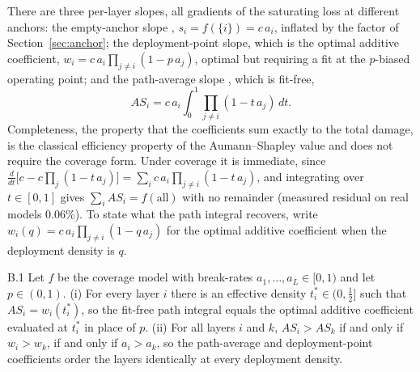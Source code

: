 There are three per-layer slopes, all gradients of the saturating loss at different anchors: the
empty-anchor slope \citep[HAWQ, isolated;][]{hawq2019,dong2020hawqv2}, $s_i = f(\{i\}) = c\,a_i$, inflated
by the factor of Section~\ref{sec:anchor}; the deployment-point slope, which is the optimal additive coefficient,
$w_i = c\,a_i\prod_{j\ne i}(1 - p\,a_j)$, optimal but requiring a fit at the $p$-biased operating point;
and the path-average slope \citep[Aumann--Shapley;][]{aumann1974values,sundararajan2017ig}, which is
fit-free,
\[
  AS_i = c\,a_i\int_0^1 \prod_{j\ne i}(1 - t\,a_j)\,dt .
\]
Completeness, the property that the coefficients sum exactly to the total damage, is the classical
efficiency property of the Aumann--Shapley value and does not require the coverage form.
Under coverage it is immediate, since
$\frac{d}{dt}\bigl[c - c\prod_j(1 - t\,a_j)\bigr] = \sum_i c\,a_i\prod_{j\ne i}(1 - t\,a_j)$, and
integrating over $t \in [0,1]$ gives $\sum_i AS_i = f(\text{all})$ with no remainder (measured residual
on real models 0.06\%). To state what the path integral recovers, write
$w_i(q) = c\,a_i\prod_{j\ne i}(1 - q\,a_j)$ for the optimal additive coefficient when the deployment
density is $q$.

\begin{customprop}{B.1}\label{prop:asrec}
Let $f$ be the coverage model with break-rates $a_1, \ldots, a_L \in [0,1)$ and let $p \in (0,1)$.
(i) For every layer $i$ there is an effective density $t_i^{*} \in (0, \tfrac12]$ such that
$AS_i = w_i(t_i^{*})$, so the fit-free path integral equals the optimal additive coefficient evaluated
at $t_i^{*}$ in place of $p$. (ii) For all layers $i$ and $k$, $AS_i > AS_k$ if and only if
$w_i > w_k$, if and only if $a_i > a_k$, so the path-average and deployment-point coefficients order
the layers identically at every deployment density.
\end{customprop}

